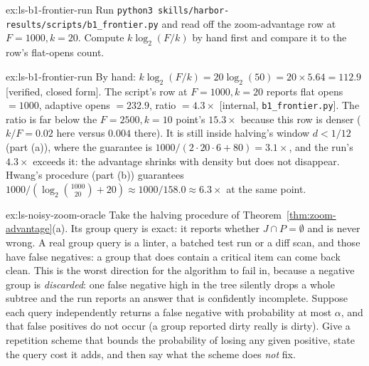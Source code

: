 \documentclass[11pt,a4paper]{article}
\theoremstyle{definition}
\theoremstyle{plain}
\begin{document}
\begin{pdexercise}[kind=Trace,rating=2]{ex:ls-b1-frontier-run}
Run \texttt{python3 skills/harbor-results/scripts/b1\_frontier.py} and read off the
zoom-advantage row at $F{=}1000,k{=}20$. Compute $k\log_2(F/k)$ by hand first and
compare it to the row's flat-opens count.
\end{pdexercise}
\begin{pdsolution}{ex:ls-b1-frontier-run}
By hand: $k\log_2(F/k)=20\log_2(50)=20\times5.64=112.9$ [verified, closed form]. The script's row at $F{=}1000,k{=}20$ reports flat opens $=1000$, adaptive opens $=232.9$, ratio $=4.3\times$ [internal, \texttt{b1\_frontier.py}]. The ratio is far below the $F{=}2500,k{=}10$ point's $15.3\times$ because this row is denser ($k/F=0.02$ here versus $0.004$ there). It is still inside halving's window $d<1/12$ (part (a)), where the guarantee is $1000/(2\cdot20\cdot6+80)=3.1\times$, and the run's $4.3\times$ exceeds it: the advantage shrinks with density but does not disappear. Hwang's procedure (part (b)) guarantees $1000/(\log_2\binom{1000}{20}+20)\approx1000/158.0\approx6.3\times$ at the same point.
\end{pdsolution}
\begin{pdexercise}[kind=Open,rating=3]{ex:ls-noisy-zoom-oracle}
Take the halving procedure of Theorem~\ref{thm:zoom-advantage}(a). Its group
query is exact: it reports whether $J\cap P=\emptyset$ and is never wrong. A real group query is a linter, a batched
test run or a diff scan, and those have false negatives: a group that does
contain a critical item can come back clean. This is the worst direction for the
algorithm to fail in, because a negative group is \emph{discarded}: one false
negative high in the tree silently drops a whole subtree and the run reports an
answer that is confidently incomplete. Suppose each query independently returns a
false negative with probability at most $\alpha$, and that false positives do not
occur (a group reported dirty really is dirty). Give a repetition scheme that
bounds the probability of losing any given positive, state the query cost it
adds, and then say what the scheme does \emph{not} fix.
\end{pdexercise}
\end{document}
